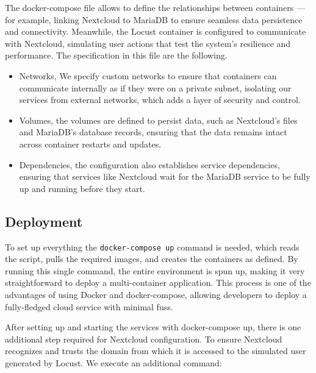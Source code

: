 \documentclass[12pt]{article}
\begin{document}
The docker-compose file allows to define the relationships between containers — for example, linking Nextcloud to MariaDB to ensure seamless data persistence and connectivity. Meanwhile, the Locust container is configured to communicate with Nextcloud, simulating user actions that test the system’s resilience and performance. The specification in this file are the following.
\begin{itemize}
    \item Networks, We specify custom networks to ensure that containers can communicate internally as if they were on a private subnet, isolating our services from external networks, which adds a layer of security and control. 
    \item Volumes, the volumes are defined to persist data, such as Nextcloud's files and MariaDB's database records, ensuring that the data remains intact across container restarts and updates.
    \item Dependencies, the configuration also establishes service dependencies, ensuring that services like Nextcloud wait for the MariaDB service to be fully up and running before they start.
\end{itemize}




\subsection{Deployment}

To set up everything the 
\verb|docker-compose up| command is needed, which reads the script, pulls the required images, and creates the containers as defined. By running this single command, the entire environment is spun up, making it very straightforward to deploy a multi-container application. This process is one of the advantages of using Docker and docker-compose, allowing developers to deploy a fully-fledged cloud service with minimal fuss.

After setting up and starting the services with docker-compose up, there is one additional step required for Nextcloud configuration. To ensure Nextcloud recognizes and trusts the domain from which it is accessed to the simulated user generated by Locust. We execute an additional command:
\end{document}
